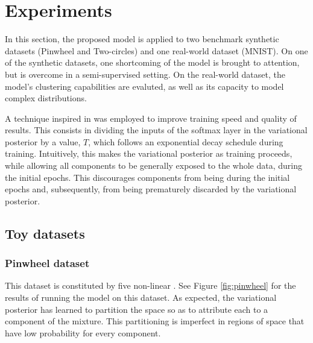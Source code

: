 \section{Experiments}
\label{section:experiments}

In this section, the proposed model is applied to two benchmark synthetic datasets (Pinwheel
and Two-circles) and one real-world dataset (MNIST). On one of the synthetic
datasets, one shortcoming of the model is brought to attention, but is overcome
in a semi-supervised setting. On the real-world dataset, the model's clustering
capabilities are evaluted, as well as its capacity to model complex distributions.

A technique inspired in \autocite{mixae} was employed to improve training
speed and quality of results. This consists in dividing the inputs of the softmax layer in
the variational posterior by a  value, $T$, which follows
an exponential decay schedule during training. Intuitively, this makes the
variational posterior  as training proceeds, while allowing all
components to be generally exposed to the whole data, during the initial epochs.
This discourages components from being  during the initial epochs
and, subsequently, from being prematurely discarded by the variational posterior.

\subsection{Toy datasets}
\subsubsection{Pinwheel dataset}

This dataset is constituted by five non-linear . See Figure \ref{fig:pinwheel}
for the results of running the model on this dataset. As expected, the variational
posterior has learned to partition the space so as to attribute each  to
a component of the mixture. This partitioning is imperfect in regions of space
that have low probability for every component.

